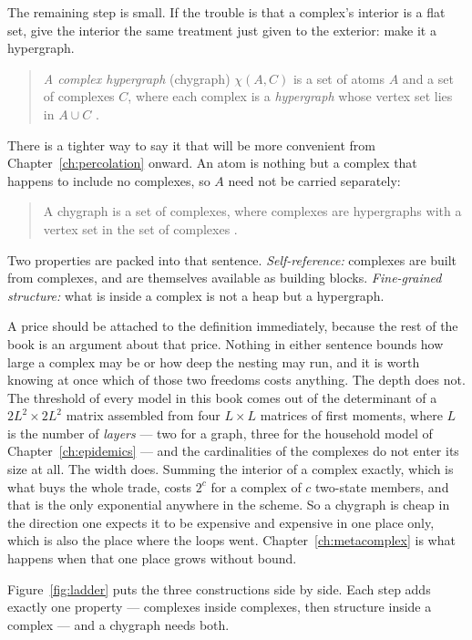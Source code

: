 The remaining step is small. If the trouble
is that a complex's interior is a flat set, give the interior the same treatment
just given to the exterior: make it a hypergraph.

\begin{quote}
\emph{A complex hypergraph} (chygraph) $\chi(A,C)$ is a set of atoms $A$ and a
set of complexes $C$, where each complex is a \emph{hypergraph} whose vertex set
lies in $A\cup C$ \citep{vazquez2023pre}.
\end{quote}

There is a tighter way to say it that will be more convenient from
Chapter~\ref{ch:percolation} onward. An atom is nothing but a complex that
happens to include no complexes, so $A$ need not be carried separately:

\begin{quote}
A chygraph is a set of complexes, where complexes are hypergraphs with a vertex
set in the set of complexes \citep{vazquez2024comnet}.
\end{quote}

Two properties are packed into that sentence. \emph{Self-reference:} complexes
are built from complexes, and are themselves available as building blocks.
\emph{Fine-grained structure:} what is inside a complex is not a heap but a
hypergraph.

A price should be attached to the definition immediately, because the rest of
the book is an argument about that price. Nothing in either sentence bounds how
large a complex may be or how deep the nesting may run, and it is worth knowing
at once which of those two freedoms costs anything. The depth does not. The
threshold of every model in this book comes out of the determinant of a
$2L^{2}\times2L^{2}$ matrix assembled from four $L\times L$ matrices of first
moments, where $L$ is the number of \emph{layers} --- two for a graph, three for
the household model of Chapter~\ref{ch:epidemics} --- and the cardinalities of
the complexes do not enter its size at all. The width does. Summing the interior
of a complex exactly, which is what buys the whole trade, costs $2^{c}$ for a
complex of $c$ two-state members, and that is the only exponential anywhere in
the scheme. So a chygraph is cheap in the direction one expects it to be
expensive and expensive in one place only, which is also the place where the
loops went. Chapter~\ref{ch:metacomplex} is what happens when that one place
grows without bound.

Figure~\ref{fig:ladder} puts the three constructions side by side. Each step
adds exactly one property --- complexes inside complexes, then structure inside
a complex --- and a chygraph needs both.


